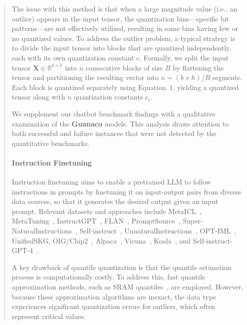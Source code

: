 \begin{quote}
The issue with this method is that when a large magnitude value (i.e., an outlier) appears in the input tensor, the quantization bins—specific bit patterns—are not effectively utilized, resulting in some bins having few or no quantized values. To address the outlier problem, a typical strategy is to divide the input tensor into blocks that are quantized independently, each with its own quantization constant $c$. Formally, we split the input tensor $\mathbf{X}\in \mathbb{R}^{b\times h}$ into $n$ consecutive blocks of size $B$ by flattening the tensor and partitioning the resulting vector into ${n = ({b\times h} )/{B} }$ segments. Each block is quantized separately using Equation~1, yielding a quantized tensor along with $n$ quantization constants $c_i$.

We supplement our chatbot benchmark findings with a qualitative examination of the \textbf{Guanaco} models. This analysis draws attention to both successful and failure instances that were not detected by the quantitative benchmarks.

\paragraph{Instruction Finetuning} Instruction finetuning aims to enable a pretrained LLM to follow instructions in prompts by finetuning it on input-output pairs from diverse data sources, so that it generates the desired output given an input prompt. Relevant datasets and approaches include MetaICL~\citep{min2021metaicl}, MetaTuning~\citep{zhong2021adapting}, InstructGPT~\citep{ouyang2022training}, FLAN~\citep{wei2021finetuned,chung2022scaling}, PromptSource~\citep{bach2022promptsource}, Super-NaturalInstructions~\citep{wang2022super,sanh2021multitask}, Self-instruct~\citep{wang2022self}, UnnaturalInstructions~\citep{honovich2022unnatural}, OPT-IML~\citep{iyer2022opt}, UnifiedSKG\citep{xie2022unifiedskg}, OIG/Chip2~\citep{laion2023}, Alpaca~\citep{alpaca}, Vicuna~\citep{vicuna2023}, Koala~\citep{koala_blogpost_2023}, and Self-instruct-GPT-4~\citep{peng2023instruction}.

A key drawback of quantile quantization is that the quantile estimation process is computationally costly. To address this, fast quantile approximation methods, such as SRAM quantiles~\citep{dettmers2022optimizers}, are employed. However, because these approximation algorithms are inexact, the data type experiences significant quantization errors for outliers, which often represent critical values.


\end{quote}
